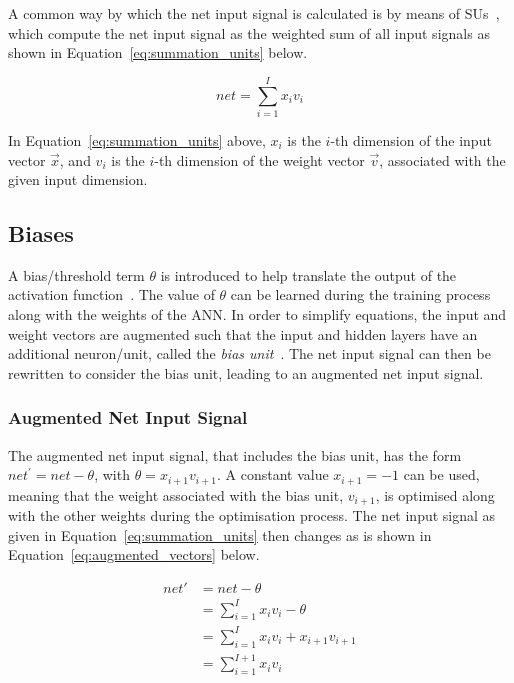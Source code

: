 A common way by which the net input signal is calculated is by means of \acp{SU}~\cite{ref:engelbrecht:2007}, which compute the net input signal as the weighted sum of all input signals as shown in Equation~\eqref{eq:summation_units} below.

\begin{equation}
      net = \sum_{i=1}^{I}{x_{i}v_{i}}
      \label{eq:summation_units}
\end{equation}

\noindent
In Equation~\eqref{eq:summation_units} above, $x_{i}$ is the $i$-th dimension of the input vector $\vec{x}$, and $v_{i}$ is the $i$-th dimension of the weight vector $\vec{v}$, associated with the given input dimension.


\subsection{Biases}\label{sec:anns:an:biases}

A bias/threshold term $\theta$ is introduced to help translate the output of the activation function~\cite{ref:benitez:1997}. The value of $\theta$ can be learned during the training process along with the weights of the \acs{ANN}. In order to simplify equations, the input and weight vectors are augmented such that the input and hidden layers have an additional neuron/unit, called the \textit{bias unit}~\cite{ref:engelbrecht:2007}. The net input signal can then be rewritten to consider the bias unit, leading to an augmented net input signal.


\subsubsection{Augmented Net Input Signal}\label{sec:anns:an:biases:augmented_net_input_signal}

The augmented net input signal, that includes the bias unit, has the form $net^{'} = net - \theta$, with $\theta = x_{i+1}v_{i+1}$. A constant value $x_{i+1} = -1$ can be used, meaning that the weight associated with the bias unit, $v_{i+1}$, is optimised along with the other weights during the optimisation process. The net input signal as given in Equation~\eqref{eq:summation_units} then changes as is shown in Equation~\eqref{eq:augmented_vectors} below.

\begin{equation}
      \begin{split}
            net{'} & = net - \theta \\
            & = \sum_{i=1}^{I} x_i v_i - \theta\\
            & = \sum_{i=1}^{I} x_i v_i + x_{i+1} v_{i+1} \\
            & = \sum_{i=1}^{I+1} x_i v_i
            \label{eq:augmented_vectors}
      \end{split}
\end{equation}


